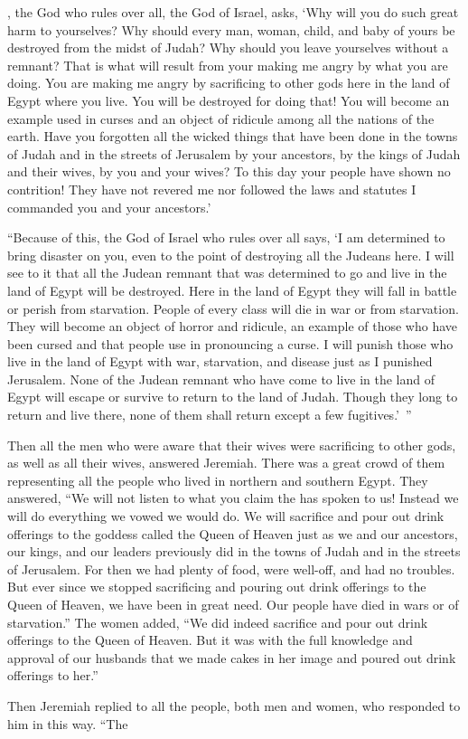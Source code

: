 {{}, the God
who rules over all,
the God
of Israel,
asks, ‘Why
will you
do
such great
harm
to
yourselves? Why should every man,
woman,
child, and baby
of yours be destroyed from the midst
of Judah? Why should you leave yourselves
without a remnant?
That is what will result from your making me angry
by what you are doing.
You are making me angry by sacrificing
to other
gods
here in the land
of Egypt
where
you
live.
You will be destroyed
for doing that! You will become
an example used in curses
and an object of ridicule
among all
the nations
of the earth.
Have you forgotten
all the wicked
things that have been
done
in the towns
of Judah
and in the streets
of Jerusalem
by your ancestors,
by
the kings
of Judah
and their wives,
by
you and your wives?
To this
day
your people have shown no
contrition! They have not revered
me nor followed
the laws
and statutes
I commanded you
and your ancestors.’
\par }{\PP {}“Because
of this,
the {}
God
of Israel
who rules over all
says, ‘I am
determined
to bring disaster
on you, even to the point of destroying
all
the Judeans here.
I will see
to it that all the Judean
remnant
that
was determined
to go
and live
in the land
of Egypt
will be destroyed.
Here in
the land
of Egypt
they will fall
in battle
or perish
from starvation.
People of every class
will die
in war
or from starvation.
They will become
an object of horror
and ridicule,
an example of those who have been cursed
and that people use in pronouncing a curse.
I will punish
those who live
in the land
of Egypt
with war,
starvation,
and disease
just
as I punished
Jerusalem.
None
of the Judean
remnant
who have come
to live
in the land
of Egypt
will
escape
or survive
to return
to the land
of Judah.
Though they
long
to return
and live
there,
none
of them shall return
except
a few fugitives.’ ”
\par }{\PP {}Then all
the men
who were aware
that
their wives
were sacrificing
to other
gods,
as well as all
their wives,
answered
Jeremiah.
There was a great
crowd
of them representing
all
the people
who lived
in northern
and southern
Egypt.
They answered,
“We will not
listen
to
what
you claim
the {}
has
spoken
to us!
Instead
we will do
everything
we vowed
we would do. We will sacrifice
and pour
out drink offerings
to the goddess
called the Queen
of Heaven
just
as we
and our ancestors,
our kings,
and our leaders
previously did
in the towns
of Judah
and in the streets
of Jerusalem.
For then we had plenty
of food,
were well-off,
and had no
troubles.
But ever since
we stopped
sacrificing
and pouring
out drink offerings
to the Queen
of Heaven,
we have been
in great need. Our people have died in wars
or of starvation.”
The women added, “We
did indeed
sacrifice
and pour out
drink offerings
to the Queen
of Heaven.
But
it was with the full knowledge and approval of our husbands
that we made
cakes
in her image
and poured out
drink offerings to her.”
\par }{\PP {}Then Jeremiah
replied
to
all
the people,
both men
and women,
who responded
to him in this way.
“The

}
